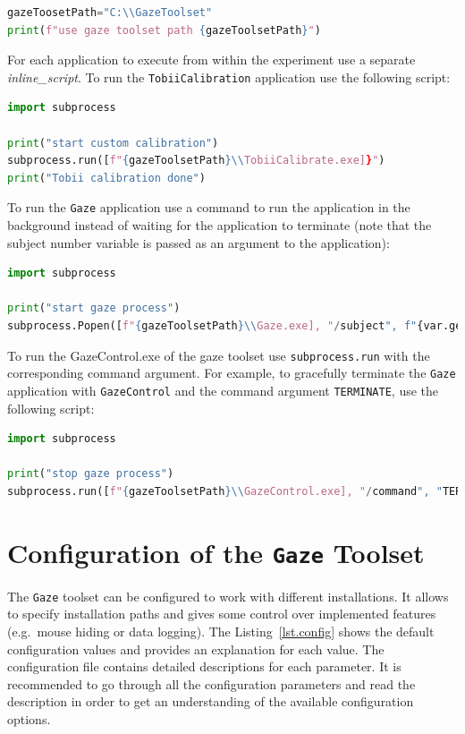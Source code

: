 \documentclass[a4paper,oneside]{book}
\begin{document}
\begin{lstlisting}[language=Python]
gazeToosetPath="C:\\GazeToolset"
print(f"use gaze toolset path {gazeToolsetPath}")
\end{lstlisting}

For each application to execute from within the experiment use a separate \emph{inline\_script}.
To run the \texttt{TobiiCalibration} application use the following script:

\begin{lstlisting}[language=Python]
import subprocess

print("start custom calibration")
subprocess.run([f"{gazeToolsetPath}\\TobiiCalibrate.exe]}")
print("Tobii calibration done")
\end{lstlisting}

To run the \texttt{Gaze} application use a command to run the application in the background instead of waiting for the application to terminate (note that the subject number variable is passed as an argument to the application):

\begin{lstlisting}[language=Python]
import subprocess

print("start gaze process")
subprocess.Popen([f"{gazeToolsetPath}\\Gaze.exe], "/subject", f"{var.get(u'subject_nr')}")
\end{lstlisting}

To run the GazeControl.exe of the gaze toolset use \texttt{subprocess.run} with the corresponding command argument.
For example, to gracefully terminate the \texttt{Gaze} application with \texttt{GazeControl} and the command argument \texttt{TERMINATE}, use the following script:

\begin{lstlisting}[language=Python]
import subprocess

print("stop gaze process")
subprocess.run([f"{gazeToolsetPath}\\GazeControl.exe], "/command", "TERMINATE")
\end{lstlisting}


\chapter{Configuration of the \texttt{Gaze} Toolset}
\label{sec.config}
The \texttt{Gaze} toolset can be configured to work with different installations.
It allows to specify installation paths and gives some control over implemented features (e.g.~mouse hiding or data logging).
The Listing~\ref{lst.config} shows the default configuration values and provides an explanation for each value.
The configuration file contains detailed descriptions for each parameter.
It is recommended to go through all the configuration parameters and read the description in order to get an understanding of the available configuration options.
\end{document}
